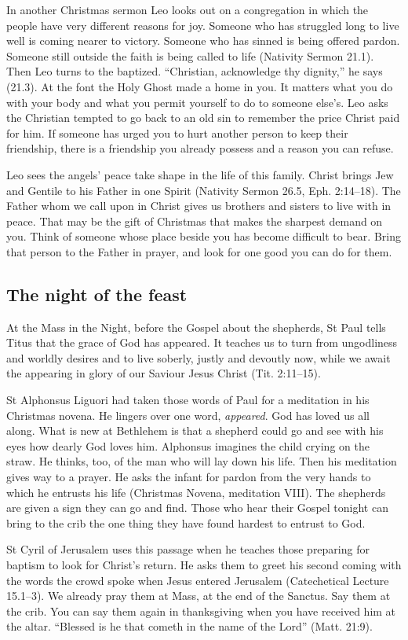 In another Christmas sermon Leo looks out on a congregation in which
the people have very different reasons for joy. Someone who has
struggled long to live well is coming nearer to victory. Someone who
has sinned is being offered pardon. Someone still outside the faith
is being called to life (Nativity Sermon 21.1). Then Leo turns to the
baptized. “Christian, acknowledge thy dignity,” he says (21.3). At the
font the Holy Ghost made a home in you. It matters what you do with
your body and what you permit yourself to do to someone else's. Leo
asks the Christian tempted to go back to an old sin to remember the
price Christ paid for him. If someone has urged you to hurt another
person to keep their friendship, there is a friendship you already
possess and a reason you can refuse.

Leo sees the angels' peace take shape in the life of this family. Christ
brings Jew and Gentile to his Father in one Spirit (Nativity Sermon 26.5,
Eph. 2:14--18). The Father whom we call upon in Christ gives us brothers
and sisters to live with in peace. That may be the gift of Christmas
that makes the sharpest demand on you. Think of someone whose place
beside you has become difficult to bear. Bring that person to the Father
in prayer, and look for one good you can do for them.

\subsection{The night of the feast}

At the Mass in the Night, before the Gospel about the shepherds, St Paul
tells Titus that the grace of God has appeared. It teaches us to turn from ungodliness and worldly desires
and to live soberly, justly and devoutly now, while we await the
appearing in glory of our Saviour Jesus Christ (Tit. 2:11--15).

St Alphonsus Liguori had taken those words of Paul for a meditation
in his Christmas novena. He lingers over one word, \emph{appeared}.
God has loved us all along. What is new at Bethlehem is that a
shepherd could go and see with his eyes how dearly God loves him.
Alphonsus imagines the child crying on the straw. He thinks, too,
of the man who will lay down his life. Then his meditation gives
way to a prayer. He asks the infant for pardon from the very hands
to which he entrusts his life (Christmas Novena, meditation VIII).
The shepherds are given a sign they can go and find. Those who hear
their Gospel tonight can bring to the crib the one thing they have
found hardest to entrust to God.

St Cyril of Jerusalem uses this passage when he teaches those preparing
for baptism to look for Christ's return. He asks them to greet his second
coming with the words the crowd spoke when Jesus entered Jerusalem
(Catechetical Lecture 15.1--3). We already pray them at Mass, at the end
of the Sanctus. Say them at the crib. You can say them again in thanksgiving
when you have received him at the altar. “Blessed is he that cometh in the
name of the Lord” (Matt. 21:9).
